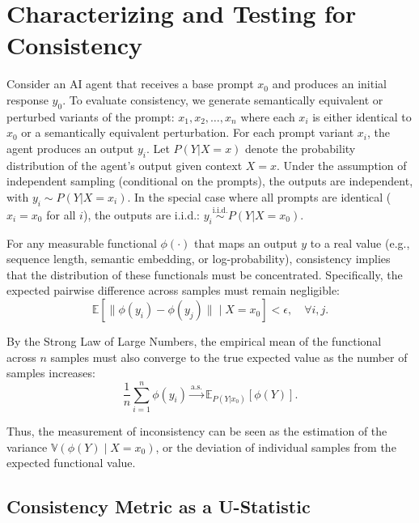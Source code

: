 \documentclass{article}
\theoremstyle{plain}
\theoremstyle{definition}
\theoremstyle{remark}
\begin{document}
\section{Characterizing and Testing for Consistency}

Consider an AI agent that receives a base prompt $x_0$ and produces an initial response $y_0$. To evaluate consistency, we generate semantically equivalent or perturbed variants of the prompt: $x_1, x_2, \ldots, x_n$ where each $x_i$ is either identical to $x_0$ or a semantically equivalent perturbation. For each prompt variant $x_i$, the agent produces an output $y_i$. Let $P(Y|X=x)$ denote the probability distribution of the agent's output given context $X = x$. Under the assumption of independent sampling (conditional on the prompts), the outputs are independent, with $y_i \sim P(Y | X=x_i) $. In the special case where all prompts are identical ($x_i = x_0$ for all $i$), the outputs are i.i.d.: $y_i \overset{\text{i.i.d.}}{\sim} P(Y | X=x_0)$.

For any measurable functional $\phi(\cdot)$ that maps an output $y$ to a real value (e.g., sequence length, semantic embedding, or log-probability), consistency implies that the distribution of these functionals must be concentrated. Specifically, the expected pairwise difference across samples must remain negligible:
\begin{equation}
    \mathbb E [\|\phi(y_i)-\phi(y_j)\| \mid X = x_0] < \epsilon, \quad \forall i, j.
\end{equation}

By the Strong Law of Large Numbers, the empirical mean of the functional across $n$ samples must also converge to the true expected value as the number of samples increases:
\begin{equation}
    \frac{1}{n} \sum_{i=1}^n \phi(y_i) \xrightarrow{\text{a.s.}} \mathbb E _{P(Y|x_0)}[\phi(Y)].
\end{equation}

Thus, the measurement of inconsistency can be seen as the estimation of the variance $\mathbb V (\phi(Y) \mid X=x_0)$, or the deviation of individual samples from the expected functional value.

\subsection{Consistency Metric as a U-Statistic}
\end{document}
